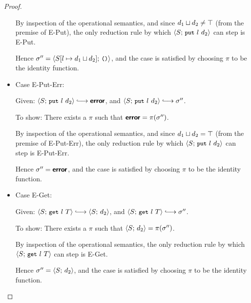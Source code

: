 \begin{proof}
\begin{itemize}
    By inspection of the operational semantics, and since
    $d_1 \sqcup d_2 \neq \top$ (from the premise of {\sc E-Put}),
    the only reduction rule by which $\langle S;\, \mbox{\small{\texttt{put}}}~l~d_2 \rangle$ can
    step is {\sc E-Put}.

    Hence $\sigma'' =
    \langle S[l \mapsto d_1 \sqcup d_2];\, \mbox{\small{\texttt{()}}} \rangle$, and the case
    is satisfied by choosing $\pi$ to be the identity function.

  \item Case {\sc E-Put-Err}:

    Given: $\config{S}{\putexp{l}{d_2}} \parstepsto \error$, and
    $\config{S}{\putexp{l}{d_2}} \parstepsto \conf''$.

    To show: There exists a $\pi$ such that $\textbf{\textsf{error}} = \pi(\sigma'')$.

    By inspection of the operational semantics, and since
    $d_1 \sqcup d_2 = \top$ (from the premise of {\sc E-Put-Err}),
    the only reduction rule by which $\langle S;\, \mbox{\small{\texttt{put}}}~l~d_2 \rangle$ can
    step is {\sc E-Put-Err}.

    Hence $\sigma'' = \textbf{\textsf{error}}$, and the case is satisfied by choosing
    $\pi$ to be the identity function.

  \item Case {\sc E-Get}:

    Given: $\config{S}{\getexp{l}{T}} \parstepsto \config{S}{d_2}$,
    and $\config{S}{\getexp{l}{T}} \parstepsto \conf''$.

    To show: There exists a $\pi$ such that $\langle S;\, d_2 \rangle =
    \pi(\sigma'')$.

    By inspection of the operational semantics, the only reduction
    rule by which $\langle S;\, \mbox{\small{\texttt{get}}}~l~T \rangle$ can step is {\sc
      E-Get}.

    Hence $\sigma'' = \langle S;\, d_2 \rangle$, and the case is satisfied by
    choosing $\pi$ to be the identity function.

  \end{itemize}
\end{proof}

